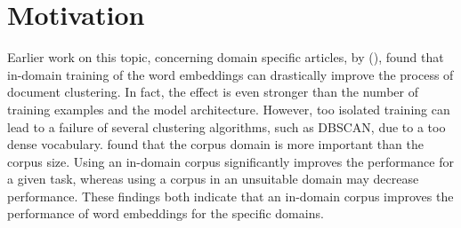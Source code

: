 \documentclass[../../Thesis.tex]{subfiles}
\begin{document}
\section{Motivation}
Earlier work on this topic, concerning domain specific articles, by (\citet{Truong2017Thesis}), found that  
in-domain training of the word embeddings can drastically improve the process of document clustering. In fact, the effect is even stronger than the number of training examples and the model architecture. However, too isolated training can lead to a failure of several clustering algorithms, such as DBSCAN, due to a too dense vocabulary\cite{Truong2017Thesis}. 
\citet{lai2016generate} found that 
the corpus domain is more important than the corpus size. Using an in-domain corpus significantly improves the performance for a given task, whereas using a corpus in an unsuitable domain may decrease performance. 
These findings both indicate that an in-domain corpus improves the performance of word embeddings for the specific domains. 

\newpage
\end{document}

